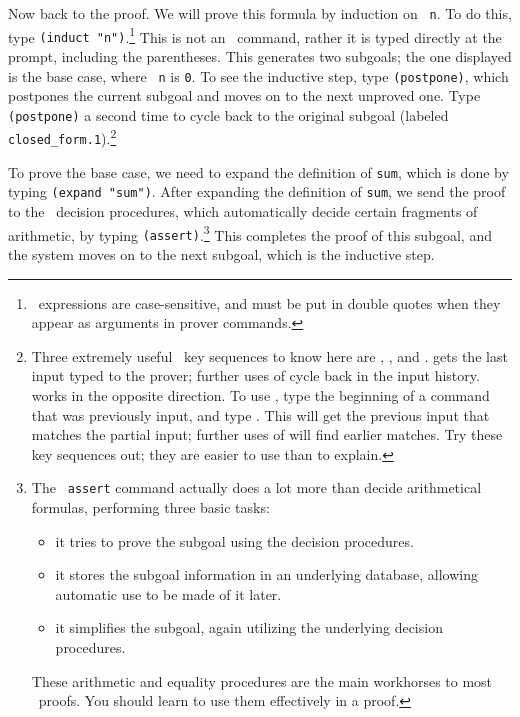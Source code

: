 Now back to the proof.  We will prove this formula by induction on {\tt
n}.  To do this, type {\tt (induct "n")}.\footnote{\pvs\ expressions are
case-sensitive, and must be put in double quotes when they appear as
arguments in prover commands.} This is not an \emacs\ command, rather it
is typed directly at the prompt, including the parentheses.  This
generates two subgoals; the one displayed is the base case, where {\tt
n} is {\tt 0}.  To see the inductive step, type {\tt (postpone)}, which
postpones the current subgoal and moves on to the next unproved one.
Type {\tt (postpone)} a second time to cycle back to the original
subgoal (labeled {\tt closed\_form.1}).\footnote{Three extremely useful
\emacs\ key sequences to know here are , , and
.   gets the last input typed to the prover; further
uses of  cycle back in the input history.   works in
the opposite direction.  To use , type the beginning of a
command that was previously input, and type .  This will get
the previous input that matches the partial input; further uses of
 will find earlier matches.  Try these key sequences out; they
are easier to use than to explain.}

To prove the base case, we need to expand the definition of {\tt sum},
which is done by typing {\tt (expand "sum")}.  After expanding the
definition of {\tt sum}, we send the proof to the \pvs\ decision
procedures, which automatically decide certain fragments of
arithmetic, by typing {\tt (assert)}.\footnote{The {\tt
assert} command actually does a lot more than decide arithmetical
formulas, performing three basic tasks:
\begin{itemize}\def\itemsep{0in}
\item it tries to prove the subgoal using the decision procedures.

\item it stores the subgoal information in an underlying database,
allowing automatic use to be made of it later.

\item it simplifies the subgoal, again utilizing the underlying decision
procedures.
\end{itemize}
These arithmetic and equality procedures are the main workhorses to
most \pvs\ proofs.  You should learn to use them effectively in a
proof.} 
This completes the proof of this subgoal, and the system moves on to
the next subgoal, which is the inductive step.

